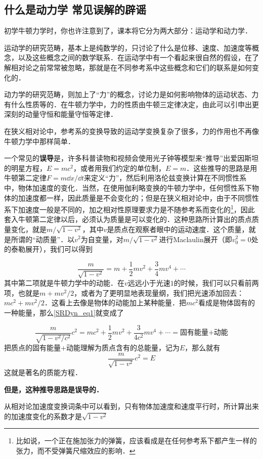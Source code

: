 

\subsection{什么是动力学 常见误解的辟谣}
初学牛顿力学时，你也许注意到了，课本将它分为两大部分：运动学和动力学．

运动学的研究范畴，基本上是纯数学的，只讨论了什么是位移、速度、加速度等概念，以及这些概念之间的数学联系．在运动学中有一个看起来很自然的假设，在了解相对论之前常常被忽略，那就是在不同参考系中这些概念和它们的联系是如何变化的．

动力学的研究范畴，则加上了“力”的概念，讨论力是如何影响物体的运动状态、力有什么性质等的．在牛顿力学中，力的性质由牛顿三定律决定，由此可以引申出更深刻的动量守恒和能量守恒等定律．

在狭义相对论中，参考系的变换导致的运动学变换复杂了很多，力的作用也不再像牛顿力学中那样简单．

一个常见的\textbf{误导}是，许多科普读物和视频会使用光子钟等模型来“推导”出爱因斯坦的明星方程，$E=mc^2$，或者用我们约定的单位制，$E=m$．这些推导的思路是用牛顿第二定律$F=m\dd x/\dd t$来定义“力”，然后利用洛伦兹变换计算在不同惯性系中，物体加速度的变化．当然，在使用伽利略变换的牛顿力学中，任何惯性系下物体的加速度都一样，因此质量是不会变化的；但是在狭义相对论中，由于不同惯性系下加速度一般是不同的，加之相对性原理要求力是不随参考系而变化的\footnote{比如说，一个正在施加张力的弹簧，应该看成是在任何参考系下都产生一样的张力，而不受弹簧尺缩效应的影响．}，因此套入牛顿第二定律以后，必须认为质量是可以变化的．这种思路所计算出的质点质量变化，就是$m/\sqrt{1-v^2}$，其中$v$是质点在观察者眼中的运动速度．这个质量，就是所谓的“动质量”．以$v^2$为自变量，对$m/\sqrt{1-v^2}$进行Maclaulin展开（即$v_0^2=0$处的泰勒展开），我们可以得到

\begin{equation}\label{SRDyn_eq1}
\frac{m}{\sqrt{1-v^2}}=m+\frac{1}{2}mv^2+\frac{3}{4}mv^4+\cdots
\end{equation}
其中第二项就是牛顿力学中的动能．在$v$远远小于光速$1$的时候，我们可以只看前两项，也就是$m+mv^2/2$，或者为了更明显地表现量纲，我们把光速添加回去：$mc^2+mv^2/2$．这看上去像是物体的动能加上某种能量．把$mc^2$看成是物体固有的一种能量，那么\autoref{SRDyn_eq1}就变成了

\begin{equation}
\frac{m}{\sqrt{1-v^2/c^2}}c^2=mc^2+\frac{1}{2}mv^2+\frac{3}{4c^2}mv^4+\cdots=\text{固有能量+动能}
\end{equation}
把质点的固有能量+动能理解为质点含有的总能量，记为$E$，那么就有
\begin{equation}
\frac{m}{\sqrt{1-v^2}}c^2=E
\end{equation}
这就是著名的质能方程．

\textbf{但是，这种推导思路是误导的．}


从相对论加速度变换词条中可以看到，只有物体加速度和速度平行时，所计算出来的加速度变化的系数才是$\sqrt{1-v^2}$